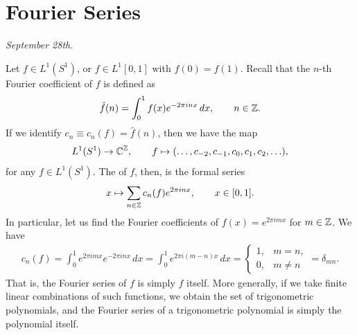 \section{Fourier Series}
\textit{September 28th.}

Let $f \in L^{1}(S^{1})$, or $f \in L^{1}[0,1]$ with $f(0) = f(1)$. Recall that the $n$-th Fourier coefficient of $f$ is defined as
\begin{align}
    \hat{f}(n) = \int_{0}^{1} f(x)e^{-2\pi i n x} \, dx, \qquad n \in \mathbb{Z}.
\end{align}
If we identify $c_{n} \equiv c_{n}(f) = \hat{f}(n)$, then we have the map
\begin{align}
    L^{1}(S^{1}) \to \mathbb{C}^{\mathbb{Z}}, \qquad f \mapsto (\ldots,c_{-2},c_{-1},c_{0},c_{1},c_{2},\ldots),
\end{align}
for any $f \in L^{1}(S^{1})$. The  of $f$, then, is the formal series
\begin{align}
    x \mapsto \sum_{n \in \mathbb{Z}} c_{n}(f)e^{2\pi i n x}, \qquad x \in [0,1].
\end{align}
In particular, let us find the Fourier coefficients of $f(x) = e^{2\pi i m x}$ for $m \in \mathbb{Z}$. We have
\begin{align}
    c_{n}(f) = \int_{0}^{1} e^{2 \pi i m x}e^{-2 \pi i n x} \, dx = \int_{0}^{1} e^{2 \pi i (m-n) x} \, dx = \begin{cases}
        1, & m=n, \\
        0, & m \neq n
    \end{cases} = \delta_{mn}.
\end{align}
That is, the Fourier series of $f$ is simply $f$ itself. More generally, if we take finite linear combinations of such functions, we obtain the set of trigonometric polynomials, and the Fourier series of a trigonometric polynomial is simply the polynomial itself.

